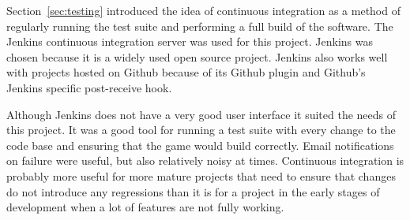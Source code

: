 Section~\ref{sec:testing} introduced the idea of continuous integration as a method
of regularly running the test suite and performing a full build of the software.
The Jenkins continuous integration server
was used for this project. Jenkins was chosen because it is a widely used open
source project.
Jenkins also works well with projects hosted on Github because of its Github plugin
and Github's Jenkins specific post-receive hook.

Although Jenkins does not have a very good user interface it suited the needs of
this project. It was a good tool for running a test suite with every change to the
code base and ensuring that the game would build correctly. Email notifications on failure
were useful, but also relatively noisy at times. Continuous integration is probably
more useful for more mature projects that need to ensure that changes do not introduce
any regressions than it is for a project in the early stages of development when a lot
of features are not fully working.
